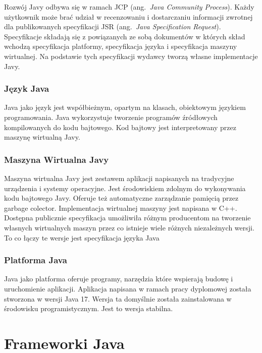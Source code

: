 Rozwój Javy odbywa się w ramach JCP (ang.~\emph{Java Community Process}). Każdy użytkownik może brać udział w recenzowaniu i dostarczaniu informacji zwrotnej dla publikowanych specyfikacji JSR (ang.~\emph{Java Specification Request}). Specyfikacje składają się z powiązanych ze sobą dokumentów w których skład wchodzą specyfikacja platformy, specyfikacja języka i specyfikacja maszyny wirtualnej. Na podstawie tych specyfikacji wydawcy tworzą własne implementacje Javy.

\subsubsection{Język Java}
Java jako język jest współbieżnym, opartym na klasach, obiektowym językiem programowania. Java wykorzystuje tworzenie programów źródłowych kompilowanych do kodu bajtowego. Kod bajtowy jest interpretowany przez maszynę wirtualną Javy.

\subsubsection{Maszyna Wirtualna Javy}
Maszyna wirtualna Javy jest zestawem aplikacji napisanych na tradycyjne urządzenia i systemy operacyjne. Jest środowiskiem  zdolnym do wykonywania kodu bajtowego Javy. Oferuje też automatyczne zarządzanie pamięcią przez garbage colector. Implementacja wirtualnej maszyny jest napisana w C++. Dostępna publicznie specyfikacja umożliwiła różnym producentom na tworzenie własnych wirtualnych maszyn przez co istnieje wiele różnych niezależnych wersji. To co łączy te wersje jest specyfikacja języka Java

\subsubsection{Platforma Java}
Java jako platforma oferuje programy, narzędzia które wspierają budowę i uruchomienie aplikacji. Aplikacja napisana w ramach pracy dyplomowej została stworzona w wersji Java 17. Wersja ta domyślnie została zainstalowana w środowisku programistycznym. Jest to wersja stabilna.

\section{Frameworki Java}

